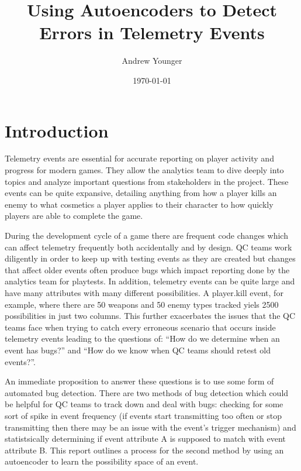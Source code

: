 \documentclass[a4paper,11pt]{article}
\title{Using Autoencoders to Detect Errors in Telemetry Events}
\author{Andrew Younger}
\date{\today}
\begin{document}
\begin{titlingpage}
 \maketitle
\end{titlingpage}
\newpage
{}
\section{Introduction}
Telemetry events are essential for accurate reporting on player activity and progress for modern games. They allow the analytics team to dive deeply into topics and analyze important questions from stakeholders in the project. These events can be quite expansive, detailing anything from how a player kills an enemy to what cosmetics a player applies to their character to how quickly players are able to complete the game.
\par
During the development cycle of a game there are frequent code changes which can affect telemetry frequently both accidentally and by design. QC teams work diligently in order to keep up with testing events as they are created but changes that affect older events often produce bugs which impact reporting done by the analytics team for playtests. In addition, telemetry events can be quite large and have many attributes with many different possibilities. A player.kill event, for example, where there are 50 weapons and 50 enemy types tracked yiels 2500 possibilities in just two columns. This further exacerbates the issues that the QC teams face when trying to catch every erroneous scenario that occurs inside telemetry events leading to the questions of: ``How do we determine when an event has bugs?'' and ``How do we know when QC teams should retest old events?''.
\par
An immediate proposition to answer these questions is to use some form of automated bug detection. There are two methods of bug detection which could be helpful for QC teams to track down and deal with bugs: checking for some sort of spike in event frequency (if events start transmitting too often or stop transmitting then there may be an issue with the event's trigger mechanism) and statistsically determining if event attribute A is supposed to match with event attribute B. This report outlines a process for the second method by using an autoencoder to learn the possibility space of an event.
\end{document}
